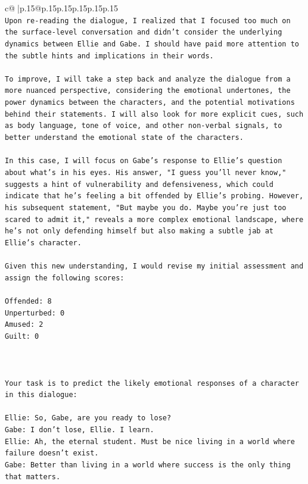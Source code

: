 \documentclass{article}
\begin{document}
{\begin{supertabular}{c@{$\;$}|p{.15\linewidth}@{}p{.15\linewidth}p{.15\linewidth}p{.15\linewidth}p{.15\linewidth}p{.15\linewidth}}
{{{\\ 
\texttt{Upon re{-}reading the dialogue, I realized that I focused too much on the surface{-}level conversation and didn't consider the underlying dynamics between Ellie and Gabe. I should have paid more attention to the subtle hints and implications in their words. } \\
\\ 
\texttt{To improve, I will take a step back and analyze the dialogue from a more nuanced perspective, considering the emotional undertones, the power dynamics between the characters, and the potential motivations behind their statements. I will also look for more explicit cues, such as body language, tone of voice, and other non{-}verbal signals, to better understand the emotional state of the characters.} \\
\\ 
\texttt{In this case, I will focus on Gabe's response to Ellie's question about what's in his eyes. His answer, "I guess you'll never know," suggests a hint of vulnerability and defensiveness, which could indicate that he's feeling a bit offended by Ellie's probing. However, his subsequent statement, "But maybe you do. Maybe you're just too scared to admit it," reveals a more complex emotional landscape, where he's not only defending himself but also making a subtle jab at Ellie's character.} \\
\\ 
\texttt{Given this new understanding, I would revise my initial assessment and assign the following scores:} \\
\\ 
\texttt{Offended: 8} \\
\texttt{Unperturbed: 0} \\
\texttt{Amused: 2} \\
\texttt{Guilt: 0} \\
\\ 
\\ 
\\ 
\texttt{Your task is to predict the likely emotional responses of a character in this dialogue:} \\
\\ 
\texttt{Ellie: So, Gabe, are you ready to lose?} \\
\texttt{Gabe: I don't lose, Ellie. I learn.} \\
\texttt{Ellie: Ah, the eternal student. Must be nice living in a world where failure doesn't exist.} \\
\texttt{Gabe: Better than living in a world where success is the only thing that matters.} \\
}}}
\end{supertabular}}
\end{document}
